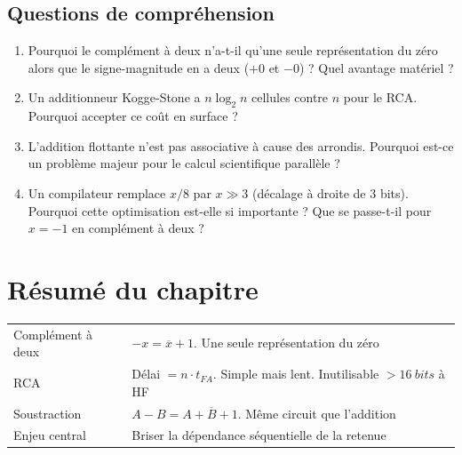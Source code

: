 \documentclass[12pt,a4paper,twoside]{book}
\begin{document}
\subsection*{Questions de compréhension}

\begin{enumerate}[nosep]
\item Pourquoi le complément à deux n'a-t-il qu'une seule représentation du zéro alors que le signe-magnitude en a deux (+0 et $-0$) ? Quel avantage matériel ?
\item Un additionneur Kogge-Stone a $n \log_2 n$ cellules contre $n$ pour le RCA. Pourquoi accepter ce coût en surface ?
\item L'addition flottante n'est pas associative à cause des arrondis. Pourquoi est-ce un problème majeur pour le calcul scientifique parallèle ?
\item Un compilateur remplace $x/8$ par $x \gg 3$ (décalage à droite de 3 bits). Pourquoi cette optimisation est-elle si importante ? Que se passe-t-il pour $x = -1$ en complément à deux ?
\end{enumerate}

\section*{Résumé du chapitre}

\begin{bases}[title={\color{white} Résumé --- Les Bases}]
\begin{center}
\renewcommand{\arraystretch}{1.3}
\begin{tabular}{p{3.5cm}p{9.5cm}}
\toprule
Complément à deux & $-x = \overline{x}+1$. Une seule représentation du zéro \\
RCA & Délai $= n \cdot t_{FA}$. Simple mais lent. Inutilisable $> \SI{16}{bits}$ à HF \\
Soustraction & $A - B = A + \overline{B} + 1$. Même circuit que l'addition \\
Enjeu central & Briser la dépendance séquentielle de la retenue \\
\bottomrule
\end{tabular}
\end{center}
\end{bases}
\end{document}

